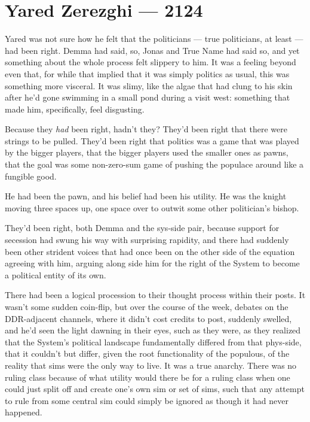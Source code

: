 \hypertarget{yared-zerezghi-2124}{%
\chapter{Yared Zerezghi — 2124}\label{yared-zerezghi-2124}}

Yared was not sure how he felt that the politicians — true politicians, at least — had been right. Demma had said, so, Jonas and True Name had said so, and yet something about the whole process felt slippery to him. It was a feeling beyond even that, for while that implied that it was simply politics as usual, this was something more visceral. It was slimy, like the algae that had clung to his skin after he'd gone swimming in a small pond during a visit west: something that made him, specifically, feel disgusting.

Because they \emph{had} been right, hadn't they? They'd been right that there were strings to be pulled. They'd been right that politics was a game that was played by the bigger players, that the bigger players used the smaller ones as pawns, that the goal was some non-zero-sum game of pushing the populace around like a fungible good.

He had been the pawn, and his belief had been his utility. He was the knight moving three spaces up, one space over to outwit some other politician's bishop.

They'd been right, both Demma and the sys-side pair, because support for secession had swung his way with surprising rapidity, and there had suddenly been other strident voices that had once been on the other side of the equation agreeing with him, arguing along side him for the right of the System to become a political entity of its own.

There had been a logical procession to their thought process within their posts. It wasn't some sudden coin-flip, but over the course of the week, debates on the DDR-adjacent channels, where it didn't cost credits to post, suddenly swelled, and he'd seen the light dawning in their eyes, such as they were, as they realized that the System's political landscape fundamentally differed from that phys-side, that it couldn't but differ, given the root functionality of the populous, of the reality that sims were the only way to live. It was a true anarchy. There was no ruling class because of what utility would there be for a ruling class when one could just split off and create one's own sim or set of sims, such that any attempt to rule from some central sim could simply be ignored as though it had never happened.

